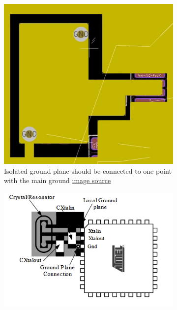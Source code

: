 \documentclass[final]{cubedoc}
\begin{document}
	
	\begin{figure}[h!]
		\centering
		\begin{subfigure}{.4\textwidth}
			\centering
			\includegraphics[height=0.2\textheight, width=\textwidth]{assets/isolated_gnd.png}
			\caption{Isolated ground plane should be connected to one point with the main ground \href{https://www.youtube.com/watch?v=t5phi3nT8OU&t=4940s}{image source}}
		\end{subfigure}
		\begin{subfigure}{.4\textwidth}
			\centering
			\includegraphics[height=0.2\textheight, width=\textwidth]{assets/layout_clock.png}
			\caption{\cite{atmel:clock}}
		\end{subfigure}
	\end{figure}
	
\end{document}

